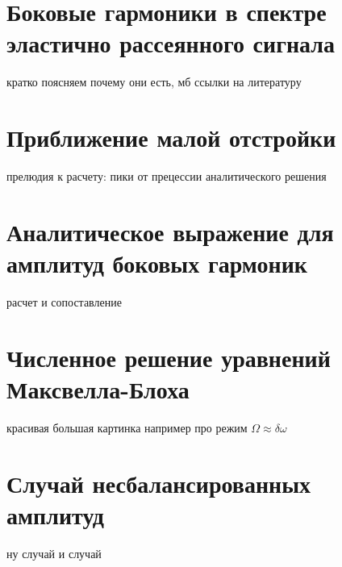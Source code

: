 \section{Боковые гармоники в спектре эластично рассеянного сигнала}
кратко поясняем почему они есть, мб ссылки на литературу
\section{Приближение малой отстройки}
прелюдия к расчету: пики от прецессии аналитического решения
\section{Аналитическое выражение для амплитуд боковых гармоник}
расчет и сопоставление
\section{Численное решение уравнений Максвелла-Блоха}
красивая большая картинка например про режим $\Omega \approx \delta \omega$
\section{Случай несбалансированных амплитуд}
 ну случай и случай
